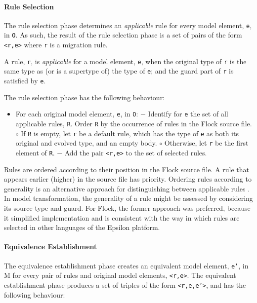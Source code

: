 \paragraph{Rule Selection}
The rule selection phase determines an \emph{applicable} rule for every model element, \texttt{e}, in \texttt{O}. As such, the result of the rule selection phase is a set of pairs of the form \texttt{<r,e>} where \texttt{r} is a migration rule.

A rule, \texttt{r}, is \emph{applicable} for a model element, \texttt{e}, when the original type of \texttt{r} is the same type as (or is a supertype of) the type of \texttt{e}; and the guard part of \texttt{r} is satisfied by \texttt{e}.

The rule selection phase has the following behaviour:

\begin{itemize}
	\item For each original model element, \texttt{e}, in \texttt{O}:
	\subitem $-$ Identify for \texttt{e} the set of all applicable rules, \texttt{R}. Order \texttt{R} by the occurrence of rules in the Flock source file.
	\subsubitem $\circ$ If \texttt{R} is empty, let \texttt{r} be a default rule, which has the type of \texttt{e} as both its original and evolved type, and an empty body.
	\subsubitem $\circ$ Otherwise, let \texttt{r} be the first element of \texttt{R}.
	\subitem $-$ Add the pair \texttt{<r,e>} to the set of selected rules.
\end{itemize}

Rules are ordered according to their position in the Flock source file. A rule that appears earlier (higher) in the source file has priority. Ordering rules according to generality is an alternative approach for distinguishing between applicable rules \cite{wallace05modular}. In model transformation, the generality of a rule might be assessed by considering its source type and guard. For Flock, the former approach was preferred, because it simplified implementation and is consistent with the way in which rules are selected in other languages of the Epsilon platform.

\paragraph{Equivalence Establishment}
The equivalence establishment phase creates an equivalent model element, \texttt{e'}, in M for every pair of rules and original model elements, \texttt{<r,e>}. The equivalent establishment phase produces a set of triples of the form \texttt{<r,e,e'>}, and has the following behaviour:

